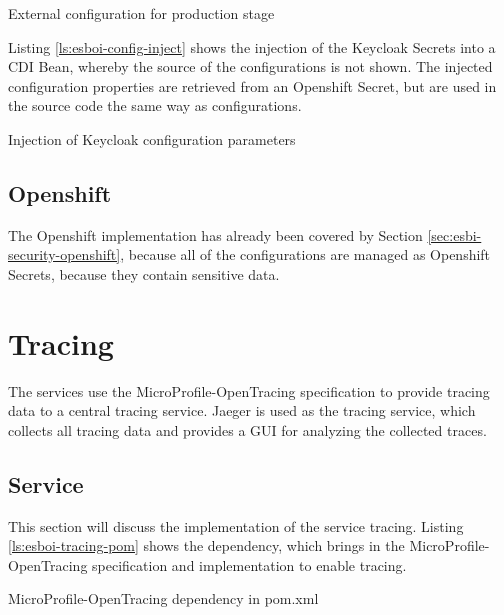 \begin{listing}[h]
	\caption{External configuration for production stage}
	\label{ls:esboi-config-project-stages-prod}
\end{listing}

Listing \vref{ls:esboi-config-inject} shows the injection of the Keycloak Secrets into a CDI Bean, whereby the source of the configurations is not shown. The injected configuration properties are retrieved from an Openshift Secret, but are used in the source code the same way as configurations.

\begin{listing}[h]
	\caption{Injection of Keycloak configuration parameters}
	\label{ls:esboi-config-inject}
\end{listing}

\subsection{Openshift}
\label{sec:esbi-config-openshift}
The Openshift implementation has already been covered by Section \vref{sec:esbi-security-openshift}, because all of the configurations are managed as Openshift Secrets, because they contain sensitive data. 

\section{Tracing}
\label{sec:esbi-tracing}
The services use the MicroProfile-OpenTracing specification to provide tracing data to a central tracing service. Jaeger is used as the tracing service, which collects all tracing data and provides a GUI for analyzing the collected traces\cite{CNCFJaeger2018}. 

\subsection{Service}
\label{sec:esbi-tracing-service}
This section will discuss the implementation of the service tracing. Listing \vref{ls:esboi-tracing-pom} shows the dependency, which brings in the MicroProfile-OpenTracing specification and implementation to enable tracing. 

\begin{listing}[h]
	\caption{MicroProfile-OpenTracing dependency in pom.xml}
	\label{ls:esboi-tracing-pom}
\end{listing}

